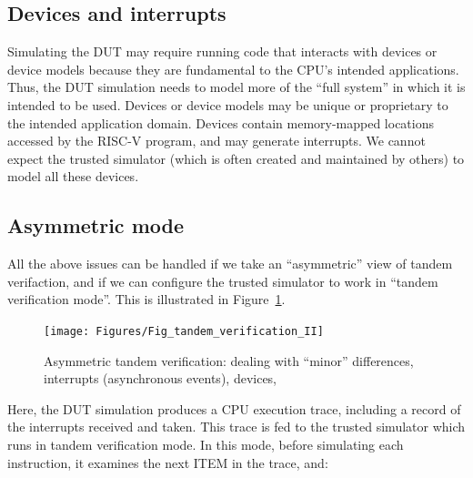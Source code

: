 
\subsection{Devices and interrupts}

Simulating the DUT may require running code that interacts with
devices or device models because they are fundamental to the CPU's
intended applications.  Thus, the DUT simulation needs to model more
of the ``full system'' in which it is intended to be used.  Devices or
device models may be unique or proprietary to the intended application
domain.  Devices contain memory-mapped locations accessed by the
RISC-V program, and may generate interrupts.  We cannot expect the
trusted simulator (which is often created and maintained by others) to
model all these devices.


\subsection{Asymmetric mode}

All the above issues can be handled if we take an ``asymmetric'' view
of tandem verifaction, and if we can configure the trusted simulator
to work in ``tandem verification mode''.  This is illustrated in
Figure~\ref{Fig_tandem_verification_II}.
\begin{figure}[htbp]
  \centerline{\texttt{[image: Figures/Fig\_tandem\_verification\_II]}}
  \caption{\label{Fig_tandem_verification_II}
           Asymmetric tandem verification: dealing with ``minor'' differences,
           interrupts (asynchronous events), devices, {\etc}}
\end{figure}

Here, the DUT simulation produces a CPU execution trace, including a
record of the interrupts received and taken.  This trace is fed to the
trusted simulator which runs in tandem verification mode.  In this
mode, before simulating each instruction, it examines the next ITEM in
the trace, and:

